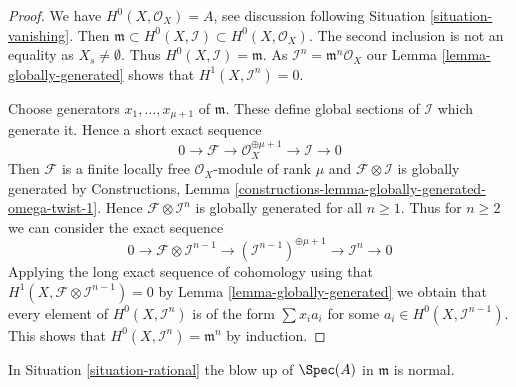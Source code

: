 \begin{proof}
We have $H^0(X, \mathcal{O}_X) = A$, see discussion following
Situation \ref{situation-vanishing}. Then
$\mathfrak m \subset H^0(X, \mathcal{I}) \subset H^0(X, \mathcal{O}_X)$.
The second inclusion is not an equality as $X_s \not = \emptyset$.
Thus $H^0(X, \mathcal{I}) = \mathfrak m$.
As $\mathcal{I}^n = \mathfrak m^n\mathcal{O}_X$ our
Lemma \ref{lemma-globally-generated} shows that $H^1(X, \mathcal{I}^n) = 0$.

\medskip\noindent
Choose generators $x_1, \ldots, x_{\mu + 1}$ of $\mathfrak m$. These define
global sections of $\mathcal{I}$ which generate it. Hence
a short exact sequence
$$
0 \to \mathcal{F} \to \mathcal{O}_X^{\oplus \mu + 1} \to \mathcal{I} \to 0
$$
Then $\mathcal{F}$ is a finite locally free $\mathcal{O}_X$-module
of rank $\mu$ and $\mathcal{F} \otimes \mathcal{I}$ is globally
generated by Constructions, Lemma
\ref{constructions-lemma-globally-generated-omega-twist-1}.
Hence $\mathcal{F} \otimes \mathcal{I}^n$
is globally generated for all $n \geq 1$. Thus for $n \geq 2$ we can
consider the exact sequence
$$
0 \to \mathcal{F} \otimes \mathcal{I}^{n - 1} \to
(\mathcal{I}^{n - 1})^{\oplus \mu + 1} \to
\mathcal{I}^n \to 0
$$
Applying the long exact sequence of cohomology using that
$H^1(X, \mathcal{F} \otimes \mathcal{I}^{n - 1}) = 0$ by
Lemma \ref{lemma-globally-generated}
we obtain that every
element of $H^0(X, \mathcal{I}^n)$ is of the form $\sum x_i a_i$
for some $a_i \in H^0(X, \mathcal{I}^{n - 1})$. This shows that
$H^0(X, \mathcal{I}^n) = \mathfrak m^n$ by induction.
\end{proof}

\begin{lemma}
\label{lemma-blow-up-normal-rational}
In Situation \ref{situation-rational}
the blow up of $\Spec(A)$ in $\mathfrak m$ is normal.
\end{lemma}

